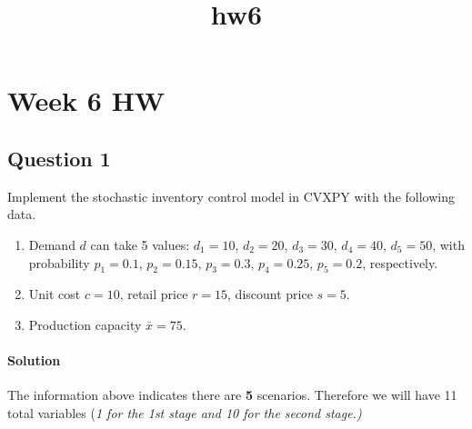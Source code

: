 \documentclass[11pt]{article}
\title{hw6}
\begin{document}
    
    
    \maketitle
    
    

    
    \hypertarget{week-6-hw}{%
\section{Week 6 HW}\label{week-6-hw}}

    \hypertarget{question-1}{%
\subsection{Question 1}\label{question-1}}

Implement the stochastic inventory control model in CVXPY with the
following data.

\begin{enumerate}
\def\labelenumi{(\alph{enumi})}
\item
  Demand \(d\) can take 5 values: \(d_1 = 10\), \(d_2 = 20\),
  \(d_3 = 30\), \(d_4 = 40\), \(d_5 = 50\), with probability
  \(p_1 = 0.1\), \(p_2 = 0.15\), \(p_3 = 0.3\), \(p_4 = 0.25\),
  \(p_5 = 0.2\), respectively.
\item
  Unit cost \(c = 10\), retail price \(r = 15\), discount price
  \(s = 5\).
\item
  Production capacity \(\bar{x} = 75\).
\end{enumerate}

\hypertarget{solution}{%
\paragraph{Solution}\label{solution}}

The information above indicates there are \textbf{5} scenarios.
Therefore we will have 11 total variables (\emph{1 for the 1st stage and
10 for the second stage.)}
\end{document}
